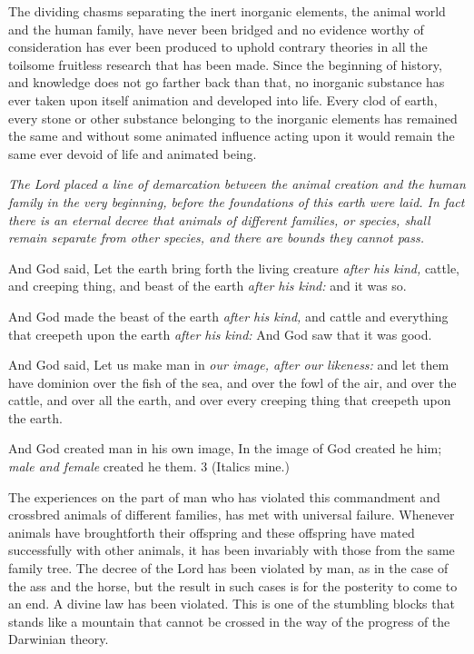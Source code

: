 The dividing chasms separating the inert inorganic elements, the animal world and the human
family, have never been bridged and no evidence worthy of consideration has ever been
produced to uphold contrary theories in all the toilsome fruitless research that has been made.
Since the beginning of history, and knowledge does not go farther back than that, no
inorganic substance has ever taken upon itself animation and developed into life. Every clod
of earth, every stone or other substance belonging to the inorganic elements has remained the
same and without some animated influence acting upon it would remain the same ever
devoid of life and animated being.

\textit{The Lord placed a line of demarcation between the animal creation and the human family in
the very beginning, before the foundations of this earth were laid. In fact there is an eternal
decree that animals of different families, or species, shall remain separate from other
species, and there are bounds they cannot pass.}

And God said, Let the earth bring forth the living creature \textit{after his kind,} cattle, and creeping
thing, and beast of the earth \textit{after his kind:} and it was so.

And God made the beast of the earth \textit{after his kind,} and cattle  and everything
that creepeth upon the earth \textit{after his kind:} And God saw that it was good.

And God said, Let us make man in \textit{our image, after our likeness:} and let them have dominion
over the fish of the sea, and over the fowl of the air, and over the cattle, and over all the
earth, and over every creeping thing that creepeth upon the earth.

And God created man in his own image, In the image of God created he him; \textit{male and
female} created he them. 3 (Italics mine.)

The experiences on the part of man who has violated this commandment and crossbred
animals of different families, has met with universal failure. Whenever animals have broughtforth their offspring and these offspring have mated successfully with other animals, it has
been invariably with those from the same family tree. The decree of the Lord has been
violated by man, as in the case of the ass and the horse, but the result in such cases is for the
posterity to come to an end. A divine law has been violated. This is one of the stumbling
blocks that stands like a mountain that cannot be crossed in the way of the progress of the
Darwinian theory.

